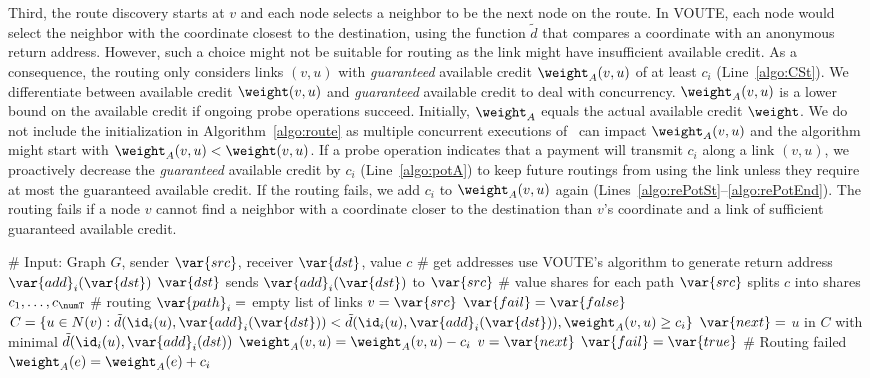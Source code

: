 Third, the route discovery starts at $v$ and each node selects a neighbor to be the next node on the route. In VOUTE, each node would select the neighbor with the coordinate closest to the destination, using the function $\tilde{d}$ that compares a coordinate with an anonymous return address.  
 However, such a choice might not be suitable for routing \money as the link might have insufficient available credit. As a consequence, the routing only considers links $(v,u)$ with \emph{guaranteed} available credit $\weight_A(v,u)$ of at least $c_i$ (Line~\ref{algo:CSt}). We differentiate between available credit $\weight(v,u)$ and  \emph{guaranteed} available credit to deal with concurrency. $\weight_A(v,u)$ is a lower bound on the available credit if ongoing probe operations succeed.
Initially, $\weight_A$ equals the actual available credit $\weight$. We do not include the initialization in Algorithm~\ref{algo:route} as multiple concurrent executions of \routePay\ can impact $\weight_A(v,u)$ and the algorithm might start with $\weight_A(v,u)<\weight(v,u)$.  
If a probe operation indicates that a payment will transmit \money $c_i$ along a link $(v,u)$, 
we proactively decrease the \emph{guaranteed} available credit by $c_i$ (Line~\ref{algo:potA}) to keep future routings from using the link unless they require at most the guaranteed available credit. 
If the routing fails, we add $c_i$ to $\weight_A(v,u)$ again (Lines~\ref{algo:rePotSt}--\ref{algo:rePotEnd}). 
The routing fails if a node $v$ cannot find a neighbor with a coordinate closer to the destination than $v$'s coordinate and a link of sufficient guaranteed available credit.     

   

\begin{algorithm}[t]
\caption{\routePay}
\label{algo:route}
\begin{algorithmic}[1]
\STATE \# Input: Graph $G$, sender $\var{src}$, receiver $\var{dst}$, value $c$
\STATE \# get addresses \label{algo:addSt}
\STATE use VOUTE's algorithm to generate return address $\var{add}_i(\var{dst})$ 
\STATE $\var{dst}$ sends $\var{add}_i(\var{dst})$ to $\var{src}$
\ENDFOR \label{algo:addEnd}
\STATE \# value shares for each path 
\STATE $\var{src}$ splits $c$ into shares $c_1, \ldots , c_{\numT}$ \label{algo:split}
\STATE \# routing \label{algo:rSt}
\STATE $\var{path}_i =$ empty list of links 
\STATE $v=\var{src}$
\STATE $\var{fail}=\var{false}$
\STATE $C=\{u \in N(v): \tilde{d}(\id_i(u), \var{add}_i(\var{dst}))< \tilde{d}(\id_i(u), \var{add}_i(\var{dst})), \weight_A(v,u)\geq c_i\}$ \label{algo:CSt}
\STATE $\var{next}=$ $u$ in $C$ with minimal $\tilde{d}(\id_i(u), \var{add}_i(dst))$ \label{algo:CEnd}
\STATE $\weight_A(v,u)=\weight_A(v,u)-c_i$ \label{algo:potA}
\STATE $v=\var{next}$
\ELSE
\STATE $\var{fail}=\var{true}$ \# Routing failed
\ENDIF
\ENDWHILE \label{algo:rEnd}
\ENDFOR
{} \label{algo:rePotSt}
\STATE $\weight_A(e)=\weight_A(e)+c_i$
\ENDFOR
\ENDIF \label{algo:rePotEnd}
\end{algorithmic}
\end{algorithm}

